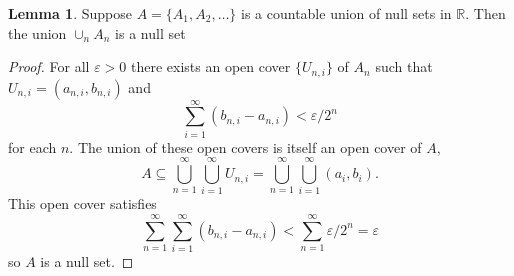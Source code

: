 \documentclass{article}
\newcommand{\R}{\mathbb{R}}
\theoremstyle{definition}
\newtheorem{lemma}{Lemma}[section]
\begin{document}
	\begin{lemma}
		Suppose $ A = \{A_1,A_2,\ldots\} $ is a countable union of null sets in $ \R $. Then the union $ \cup_n A_n$ is a null set
	\end{lemma}
	\begin{proof}
		For all $ \varepsilon > 0 $ there exists an open cover $ \{U_{n,i}\} $ of $ A_n $ such that $U_{n,i}=(a_{n,i},b_{n,i})$ and $$\sum_{i=1}^\infty(b_{n,i}-a_{n,i})<\varepsilon/2^n$$ for each $ n $. The union of these open covers is itself an open cover of $ A $,
		$$ A\subseteq \bigcup_{n=1}^\infty\bigcup_{i=1}^\infty U_{n,i} = \bigcup_{n=1}^\infty\bigcup_{i=1}^\infty (a_i,b_i).$$ This open cover satisfies 
		$$ \sum_{n=1}^\infty\sum_{i=1}^\infty(b_{n,i}-a_{n,i})<\sum_{n=1}^\infty\varepsilon/2^n=\varepsilon$$ so $ A $ is a null set.
	\end{proof}
	
\end{document}
